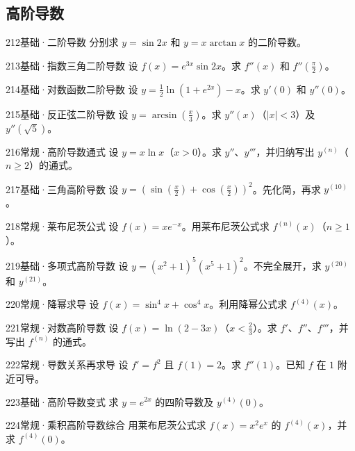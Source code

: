 \subsection{高阶导数}
\begin{exercise}{212}{基础·二阶导数}
分别求 $y=\sin2x$ 和 $y=x\arctan x$ 的二阶导数。
\end{exercise}
\begin{exercise}{213}{基础·指数三角二阶导数}
设 $f(x)=e^{3x}\sin2x$。求 $f''(x)$ 和 $f''(\frac{\pi}{2})$。
\end{exercise}
\begin{exercise}{214}{基础·对数函数二阶导数}
设 $y=\frac12\ln(1+e^{2x})-x$。求 $y'(0)$ 和 $y''(0)$。
\end{exercise}
\begin{exercise}{215}{基础·反正弦二阶导数}
设 $y=\arcsin(\frac{x}{3})$。求 $y''(x)$（$|x|<3$）及 $y''(\sqrt5)$。
\end{exercise}
\begin{exercise}{216}{常规·高阶导数通式}
设 $y=x\ln x$（$x>0$）。求 $y''$、$y'''$，并归纳写出 $y^{(n)}$（$n\ge2$）的通式。
\end{exercise}
\begin{exercise}{217}{基础·三角高阶导数}
设 $y=(\sin(\frac{x}{2})+\cos(\frac{x}{2}))^2$。先化简，再求 $y^{(10)}$。
\end{exercise}
\begin{exercise}{218}{常规·莱布尼茨公式}
设 $f(x)=xe^{-x}$。用莱布尼茨公式求 $f^{(n)}(x)$（$n\ge1$）。
\end{exercise}
\begin{exercise}{219}{基础·多项式高阶导数}
设 $y=(x^2+1)^5(x^5+1)^2$。不完全展开，求 $y^{(20)}$ 和 $y^{(21)}$。
\end{exercise}
\begin{exercise}{220}{常规·降幂求导}
设 $f(x)=\sin^4x+\cos^4x$。利用降幂公式求 $f^{(4)}(x)$。
\end{exercise}
\begin{exercise}{221}{常规·对数高阶导数}
设 $f(x)=\ln(2-3x)$（$x<\frac{2}{3}$）。求 $f'$、$f''$、$f'''$，并写出 $f^{(n)}$ 的通式。
\end{exercise}
\begin{exercise}{222}{常规·导数关系再求导}
设 $f'=f^2$ 且 $f(1)=2$。求 $f''(1)$。已知 $f$ 在 $1$ 附近可导。
\end{exercise}
\begin{exercise}{223}{基础·高阶导数变式}
求 $y=e^{2x}$ 的四阶导数及 $y^{(4)}(0)$。
\end{exercise}
\begin{exercise}{224}{常规·乘积高阶导数综合}
用莱布尼茨公式求 $f(x)=x^2e^x$ 的 $f^{(4)}(x)$，并求 $f^{(4)}(0)$。
\end{exercise}
